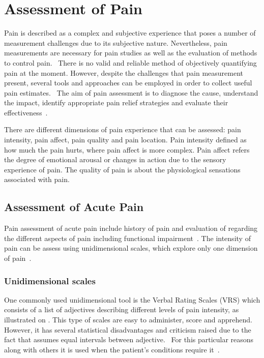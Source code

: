 \section{Assessment of Pain}
Pain is described as a complex and subjective experience that poses a number of measurement challenges due to its subjective nature. Nevertheless, pain measurements are necessary for pain studies as well as the evaluation of methods to control pain.~\cite{Jensen2001} There is no valid and reliable method of objectively quantifying pain at the moment. However, despite the challenges that pain measurement present, several tools and approaches can be employed in order to collect useful pain estimates.~\cite{Younger2010} The aim of pain assessment is to diagnose the cause, understand the impact, identify appropriate pain relief strategies and evaluate their effectiveness~\cite{Briggs2010}.

There are different dimensions of pain experience that can be assessed: pain intensity, pain affect, pain quality and pain location. Pain intensity defined as how much the pain hurts, where pain affect is more complex. Pain affect refers the degree of emotional arousal or changes in action due to the sensory experience of pain. The quality of pain is about the physiological sensations associated with pain. 

\subsection{Assessment of Acute Pain}
Pain assessment of acute pain include history of pain and evaluation of regarding the different aspects of pain including functional impairment~\cite{Gupta2014}. The intensity of pain can be assess using unidimensional scales, which explore only one dimension of pain~\cite{Jensen2001}. %

\subsubsection{Unidimensional scales}
One commonly used unidimensional tool is the Verbal Rating Scales (VRS) which consists of a list of adjectives describing different levels of pain intensity, as illustrated on . This type of scales are easy to administer, score and apprehend. However, it has several statistical disadvantages and criticism raised due to the fact that assumes equal intervals between adjective.~\cite{Jensen2001} For this particular reasons along with others it is used when the patient's conditions require it~\cite{Jensen1986}. 

